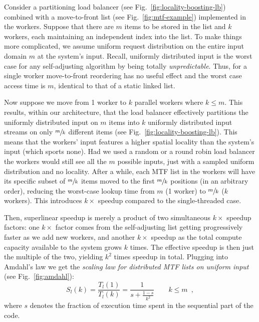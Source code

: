 Consider a partitioning load balancer (see Fig.~\ref{fig:locality-boosting-lb}) combined with a move-to-front list (see Fig.~\ref{fig:mtf-example}) implemented in the workers. Suppose that there are $m$ items to be stored in the list and $k$ workers, each maintaining an independent index into the list. To make things more complicated, we assume uniform request distribution on the entire input domain $m$ at the system's input. Recall, uniformly distributed input is the worst case for any self-adjusting algorithm by being totally \emph{unpredictable}. Thus, for a single worker move-to-front reordering has no useful effect and the worst case access time is $m$, identical to that of a static linked list.

Now suppose we move from 1 worker to $k$ parallel workers where $k \le m$. This results, within our architecture, that the load balancer effectively partitions the uniformly distributed input on $m$ items into $k$ uniformly distributed input streams on only $\sfrac{m}{k}$ different items (see Fig.~\ref{fig:locality-boosting-lb}). This means that the workers' input features a higher spatial locality than the system's input (which sports none).  Had we used a random or a round robin load balancer the workers would still see all the $m$ possible inputs, just with a sampled uniform distribution and no locality. After a while, each MTF list in the workers will have its specific subset of $\sfrac{m}{k}$ items moved to the first $\sfrac{m}{k}$ positions (in an arbitrary order), reducing the worst-case lookup time from $m$ (1 worker) to $\sfrac{m}{k}$ ($k$ workers). This introduces $k\times$ speedup compared to the single-threaded case.

Then, superlinear speedup is merely a product of two simultaneous $k\times$ speedup factors: one $k\times$ factor comes from the self-adjusting list getting progressively faster as we add new workers, and another $k\times$ speedup as the total compute capacity available to the system grows $k$ times. The effective speedup is then just the multiple of the two, yielding $k^2$ times speedup in total. Plugging into Amdahl's law we get the \emph{scaling law for distributed MTF lists on uniform input} (see Fig.~\ref{fig:amdahl}):
\begin{equation}\label{eq:mtf-perf}
  S_l(k) = \frac{T_l(1)}{T_l(k)} = \frac1{s + \frac{1-s}{k^2}} \qquad k \le m \enspace ,
\end{equation}
where $s$ denotes the fraction of execution time spent in the sequential part of the code.

